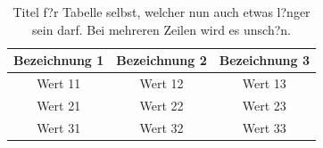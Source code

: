 \begin{table}
\begin{center}
\caption[Kurzer Titel f?r Tabellenverzeichnis]{Titel f?r Tabelle selbst, welcher nun auch etwas l?nger sein darf. Bei mehreren Zeilen wird es unsch?n.}
\label{tab:tab1}
\begin{tabular}{ccc}
\toprule[1.2pt]
\textbf{Bezeichnung 1} & \textbf{Bezeichnung 2} & \textbf{Bezeichnung 3} \\  %
\midrule[1.2pt]\midrule[1.0pt]
Wert 11       & Wert 12     & Wert 13  	    \\
Wert 21       & Wert 22     & Wert 23  	    \\
Wert 31       & Wert 32     & Wert 33  	    \\
\hline
\end{tabular}
\end{center}
\end{table}

